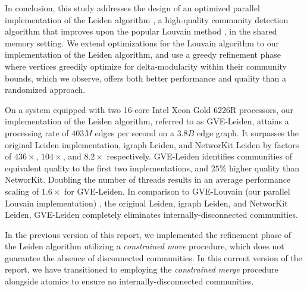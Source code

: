 In conclusion, this study addresses the design of an optimized parallel implementation of the Leiden algorithm \cite{com-traag19}, a high-quality community detection algorithm that improves upon the popular Louvain method \cite{com-blondel08}, in the shared memory setting. We extend optimizations for the Louvain algorithm \cite{sahu2023gvelouvain} to our implementation of the Leiden algorithm, and use a greedy refinement phase where vertices greedily optimize for delta-modularity within their community bounds, which we observe, offers both better performance and quality than a randomized approach.

On a system equipped with two 16-core Intel Xeon Gold 6226R processors, our implementation of the Leiden algorithm, referred to as GVE-Leiden, attains a processing rate of $403 M$ edges per second on a $3.8 B$ edge graph. It surpasses the original Leiden implementation, igraph Leiden, and NetworKit Leiden by factors of $436\times$, $104\times$, and $8.2\times$ respectively. GVE-Leiden identifies communities of equivalent quality to the first two implementations, and $25\%$ higher quality than NetworKit. Doubling the number of threads results in an average performance scaling of $1.6\times$ for GVE-Leiden. In comparison to GVE-Louvain (our parallel Louvain implementation) \cite{sahu2023gvelouvain}, the original Leiden, igraph Leiden, and NetworKit Leiden, GVE-Leiden completely eliminates internally-disconnected communities.

In the previous version of this report, we implemented the refinement phase of the Leiden algorithm utilizing a \textit{constrained move} procedure, which does not guarantee the absence of disconnected communities. In this current version of the report, we have transitioned to employing the \textit{constrained merge} procedure alongside atomics to ensure no internally-disconnected communities.
